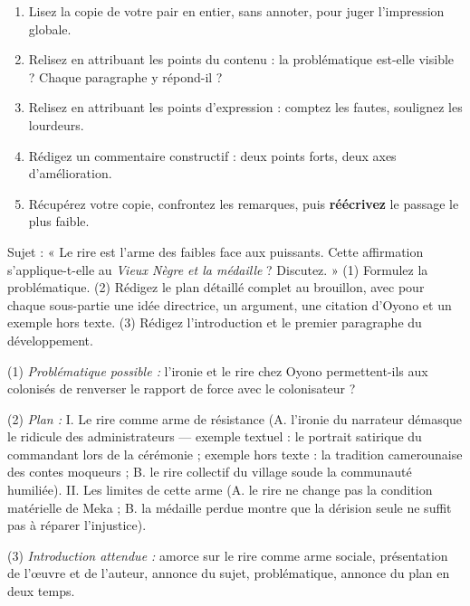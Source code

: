 \documentclass[11pt]{article}
\begin{document}
\begin{methode}
\begin{enumerate}
\item Lisez la copie de votre pair en entier, sans annoter, pour juger l'impression globale.
\item Relisez en attribuant les points du contenu : la problématique est-elle visible ? Chaque paragraphe y répond-il ?
\item Relisez en attribuant les points d'expression : comptez les fautes, soulignez les lourdeurs.
\item Rédigez un commentaire constructif : deux points forts, deux axes d'amélioration.
\item Récupérez votre copie, confrontez les remarques, puis \textbf{réécrivez} le passage le plus faible.
\end{enumerate}
\end{methode}

\begin{exercice}
Sujet : « Le rire est l'arme des faibles face aux puissants. Cette affirmation s'applique-t-elle au \emph{Vieux Nègre et la médaille} ? Discutez. » (1) Formulez la problématique. (2) Rédigez le plan détaillé complet au brouillon, avec pour chaque sous-partie une idée directrice, un argument, une citation d'Oyono et un exemple hors texte. (3) Rédigez l'introduction et le premier paragraphe du développement.
\end{exercice}

\begin{corrige}[Exercice]
(1) \emph{Problématique possible :} l'ironie et le rire chez Oyono permettent-ils aux colonisés de renverser le rapport de force avec le colonisateur ?\par
(2) \emph{Plan :} I. Le rire comme arme de résistance (A. l'ironie du narrateur démasque le ridicule des administrateurs — exemple textuel : le portrait satirique du commandant lors de la cérémonie ; exemple hors texte : la tradition camerounaise des contes moqueurs ; B. le rire collectif du village soude la communauté humiliée). II. Les limites de cette arme (A. le rire ne change pas la condition matérielle de Meka ; B. la médaille perdue montre que la dérision seule ne suffit pas à réparer l'injustice).\par
(3) \emph{Introduction attendue :} amorce sur le rire comme arme sociale, présentation de l'œuvre et de l'auteur, annonce du sujet, problématique, annonce du plan en deux temps.
\end{corrige}
\end{document}
